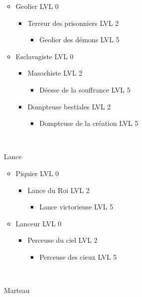 \begin{itemize}
\begin{itemize}
			\item Geolier LVL 0
				\begin{itemize}
					\item Terreur des prisonniers LVL 2
						\begin{itemize}
							\item Geolier des démons LVL 5
						\end{itemize}
				\end{itemize}
			\item Esclavagiste LVL 0
				\begin{itemize}
					\item Masochiste LVL 2
						\begin{itemize}
							\item Déesse de la souffrance LVL 5
						\end{itemize}
					\item Dompteuse bestiales LVL 2
						\begin{itemize}
							\item Dompteuse de la création LVL 5
						\end{itemize}
				\end{itemize}
		\end{itemize}~\\
	\item[Lance]~\\
		\begin{itemize}
			\item Piquier LVL 0
				\begin{itemize}
					\item Lance du Roi LVL 2
						\begin{itemize}
							\item Lance victorieuse LVL 5
						\end{itemize}
				\end{itemize}
			\item Lanceur LVL 0
				\begin{itemize}
					\item Perceuse du ciel LVL 2
						\begin{itemize}
							\item Perceuse des cieux LVL 5
						\end{itemize}
				\end{itemize}
		\end{itemize}~\\
	\item[Marteau]~\\
		\begin{itemize}

\end{itemize}
\end{itemize}
